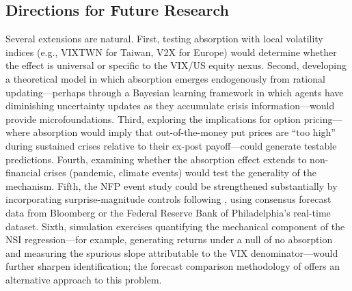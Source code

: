 \documentclass[12pt,a4paper]{article}
\begin{document}
\subsection{Directions for Future Research}

Several extensions are natural. First, testing absorption with local volatility indices (e.g., VIXTWN for Taiwan, V2X for Europe) would determine whether the effect is universal or specific to the VIX/US equity nexus. Second, developing a theoretical model in which absorption emerges endogenously from rational updating---perhaps through a Bayesian learning framework in which agents have diminishing uncertainty updates as they accumulate crisis information---would provide microfoundations. Third, exploring the implications for option pricing---where absorption would imply that out-of-the-money put prices are ``too high'' during sustained crises relative to their ex-post payoff---could generate testable predictions. Fourth, examining whether the absorption effect extends to non-financial crises (pandemic, climate events) would test the generality of the mechanism. Fifth, the NFP event study could be strengthened substantially by incorporating surprise-magnitude controls following \citet{andersen2003}, using consensus forecast data from Bloomberg or the Federal Reserve Bank of Philadelphia's real-time dataset. Sixth, simulation exercises quantifying the mechanical component of the NSI regression---for example, generating returns under a null of no absorption and measuring the spurious slope attributable to the VIX denominator---would further sharpen identification; the forecast comparison methodology of \citet{patton2011} offers an alternative approach to this problem.

\newpage
\end{document}

